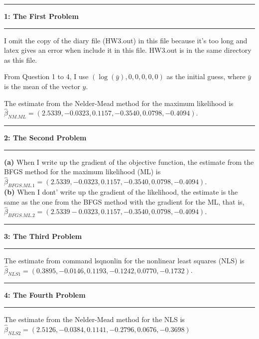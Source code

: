\documentclass[11pt]{article}
\newcommand\question[2]{\vspace{.25in}\hrule\textbf{#1: #2}\vspace{.5em}\hrule\vspace{.10in}}
\renewcommand\part[1]{\vspace{.10in}\textbf{(#1)}}
\begin{document}
\raggedright
\newcommand\NAME{Motoaki Takahashi}  %
\newcommand\ANDREWID{mxt323}     %
\newcommand\HWNUM{3}              %


\question{1}{The First Problem} 
I omit the copy of the diary file (HW3.out) in this file because it's too long and latex gives an error when include it in this file. HW3.out is in the same directory as this file.\par
From Question 1 to 4, I use $(\log(\bar{y}), 0, 0, 0, 0, 0)$ as the initial guess, where $\bar{y}$ is the mean of the vector $y$.\par
The estimate from the Nelder-Mead method for the maximum likelihood is $\hat{\beta}_{NM.ML}=(2.5339,
   -0.0323,
    0.1157,
   -0.3540,
    0.0798,
   -0.4094)$.



\question{2}{The Second Problem}
\part{a} When I write up the gradient of the objective function, the estimate from the BFGS method for the maximum likelihood (ML) is $\hat{\beta}_{BFGS.ML.1}=(    2.5339,
   -0.0323,
    0.1157,
   -0.3540,
    0.0798,
   -0.4094).$\\
\part{b} When I dont' write up the gradient of the likelihood, the estimate is the same as the one from the BFGS method with the gradient for the ML, that is, $\hat{\beta}_{BFGS.ML.2}=(        2.5339
   -0.0323,
    0.1157,
   -0.3540,
    0.0798,
   -0.4094).$

\question{3}{The Third Problem}
The estimate from command lsqnonlin for the nonlinear least squares (NLS) is $\hat{\beta}_{NLS1}=(0.3895,
   -0.0146,
    0.1193,
   -0.1242,
    0.0770,
   -0.1732)$.

\question{4}{The Fourth Problem}
The estimate from the Nelder-Mead method for the NLS is$\hat{\beta}_{NLS2}=(2.5126,
   -0.0384,
    0.1141,
   -0.2796,
    0.0676,
   -0.3698)$
\end{document}
